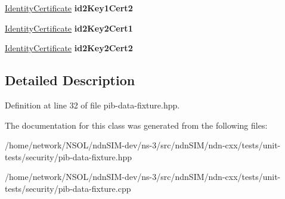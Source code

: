 \begin{DoxyCompactItemize}
\item 
\hyperlink{classndn_1_1IdentityCertificate}{Identity\+Certificate} {\bfseries id2\+Key1\+Cert2}\hypertarget{classndn_1_1security_1_1PibDataFixture_a6c86a51288b1d99384d9bcce54f47892}{}\label{classndn_1_1security_1_1PibDataFixture_a6c86a51288b1d99384d9bcce54f47892}

\item 
\hyperlink{classndn_1_1IdentityCertificate}{Identity\+Certificate} {\bfseries id2\+Key2\+Cert1}\hypertarget{classndn_1_1security_1_1PibDataFixture_aadc761f7468cf2d7ae3569440d912f03}{}\label{classndn_1_1security_1_1PibDataFixture_aadc761f7468cf2d7ae3569440d912f03}

\item 
\hyperlink{classndn_1_1IdentityCertificate}{Identity\+Certificate} {\bfseries id2\+Key2\+Cert2}\hypertarget{classndn_1_1security_1_1PibDataFixture_a3b8e786a1d66cd8ec144b111d11138ba}{}\label{classndn_1_1security_1_1PibDataFixture_a3b8e786a1d66cd8ec144b111d11138ba}

\end{DoxyCompactItemize}


\subsection{Detailed Description}


Definition at line 32 of file pib-\/data-\/fixture.\+hpp.



The documentation for this class was generated from the following files\+:\begin{DoxyCompactItemize}
\item 
/home/network/\+N\+S\+O\+L/ndn\+S\+I\+M-\/dev/ns-\/3/src/ndn\+S\+I\+M/ndn-\/cxx/tests/unit-\/tests/security/pib-\/data-\/fixture.\+hpp\item 
/home/network/\+N\+S\+O\+L/ndn\+S\+I\+M-\/dev/ns-\/3/src/ndn\+S\+I\+M/ndn-\/cxx/tests/unit-\/tests/security/pib-\/data-\/fixture.\+cpp\end{DoxyCompactItemize}
